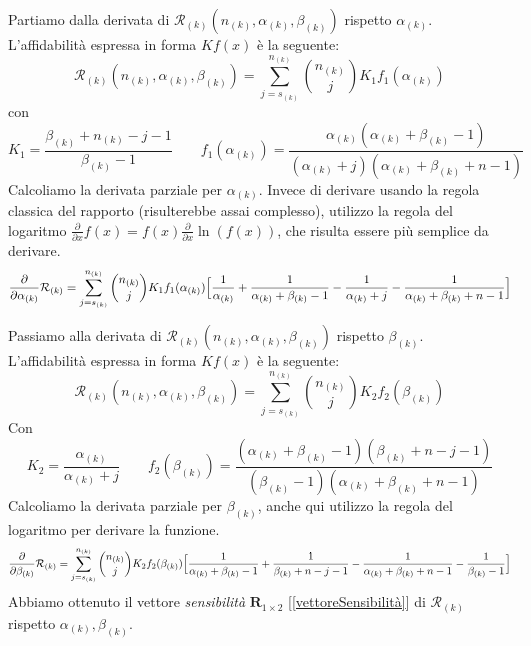\documentclass[10pt]{article} %
\begin{document}
Partiamo dalla derivata di $\mathcal{R}_{(k)}(n_{(k)}, \alpha_{(k)}, \beta_{(k)})$ rispetto $\alpha_{(k)}$.\\
L'affidabilità espressa in forma $Kf(x)$ è la seguente:
\begin{equation}
    \mathcal{R}_{(k)}(n_{(k)}, \alpha_{(k)}, \beta_{(k)}) = \sum_{j = s_{(k)}}^{n_{(k)}} \binom{n_{(k)}}{j} K_{1}f_{1}(\alpha_{(k)})
\end{equation}
con
\begin{equation}
    K_{1} = \dfrac{\beta_{(k)} + n_{(k)} - j - 1}{\beta_{(k)} - 1} \qquad
    f_{1}(\alpha_{(k)}) = \dfrac{\alpha_{(k)}(\alpha_{(k)}+\beta_{(k)} -1)}{(\alpha_{(k)} + j)(\alpha_{(k)}+\beta_{(k)}+n-1)}
\end{equation}
Calcoliamo la derivata parziale per $\alpha_{(k)}$. Invece di derivare usando la regola classica del rapporto (risulterebbe assai complesso), utilizzo la regola del logaritmo $\frac{\partial}{\partial x}f(x) = f(x)\frac{\partial}{\partial x}\ln(f(x))$, che risulta essere più semplice da derivare.
\begin{equation}
    \dfrac{\partial}{\partial \alpha_{(k)}}\mathcal{R}_{(k)}= \sum_{j = s_{(k)}}^{n_{(k)}} \binom{n_{(k)}}{j} K_{1}f_{1}(\alpha_{(k)})
    \Bigl[ \frac{1}{\alpha_{(k)}} + \frac{1}{\alpha_{(k)} + \beta_{(k)} -1} -\frac{1}{\alpha_{(k)}+j} - \frac{1}{\alpha_{(k)} + \beta_{(k)} + n -1}\Bigr]
\end{equation}

Passiamo alla derivata di $\mathcal{R}_{(k)}(n_{(k)}, \alpha_{(k)}, \beta_{(k)})$ rispetto $\beta_{(k)}$.\\
L'affidabilità espressa in forma $Kf(x)$ è la seguente:
\begin{equation}
    \mathcal{R}_{(k)}(n_{(k)}, \alpha_{(k)}, \beta_{(k)}) = \sum_{j = s_{(k)}}^{n_{(k)}} \binom{n_{(k)}}{j} K_{2}f_{2}(\beta_{(k)})
\end{equation}
Con
\begin{equation}
    K_{2} = \dfrac{\alpha_{(k)}}{\alpha_{(k)} + j} \qquad
    f_{2}(\beta_{(k)}) = \dfrac{(\alpha_{(k)} + \beta_{(k)} - 1)(\beta_{(k)} + n - j - 1)}{(\beta_{(k)}-1)(\alpha_{(k)}+ \beta_{(k)} + n -1)}
\end{equation}
Calcoliamo la derivata parziale per $\beta_{(k)}$, anche qui utilizzo la regola del logaritmo per derivare la funzione.
\begin{equation}
    \dfrac{\partial}{\partial \beta_{(k)}}\mathcal{R}_{(k)}= \sum_{j = s_{(k)}}^{n_{(k)}} \binom{n_{(k)}}{j} K_{2}f_{2}(\beta_{(k)})
    \Bigl[ \frac{1}{\alpha_{(k)} + \beta_{(k)} - 1} + \frac{1}{\beta_{(k)} + n - j - 1} -\frac{1}{\alpha_{(k)}+\beta_{(k)} + n -1} - \frac{1}{\beta_{(k)} - 1}\Bigr]
\end{equation}
Abbiamo ottenuto il vettore \textit{sensibilità} $\mathbf{R}_{1\times2}$ [\ref{vettoreSensibilità}] di $\mathcal{R}_{(k)}$ rispetto $\alpha_{(k)}, \beta_{(k)}$.
\end{document}
